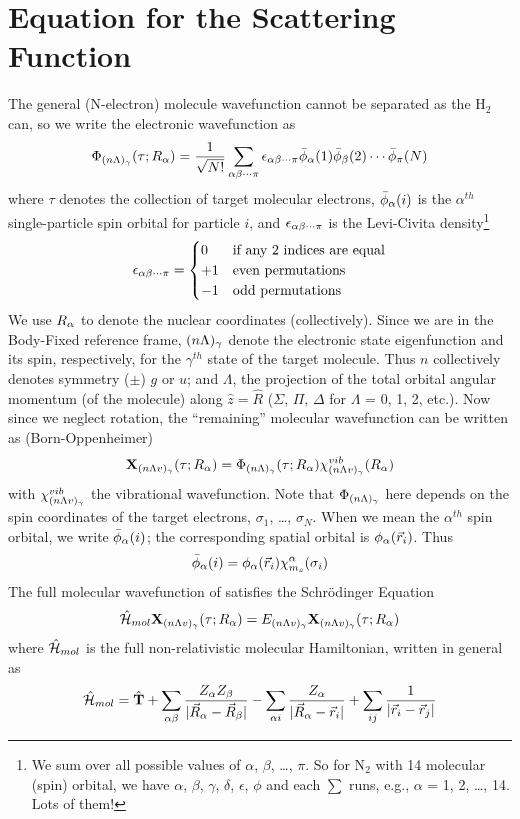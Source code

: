\documentclass[aps,pra,groupedaddress,12pt,
               amsfonts,amssymb,
               preprint
    ]{revtex4}
\begin{document}
\section{Equation for the Scattering Function}
The general (N-electron) molecule wavefunction cannot be separated as
the H$_2$ can, so we write the electronic wavefunction as
\begin{equation}
  \label{eq:ew}
  \Phi_{(n\Lambda)_\gamma}(\tau;R_\alpha)=\dfrac{1}{\sqrt{N!}}
  \sum_{\alpha\beta\cdots\pi}\epsilon_{\alpha\beta\cdots\pi}\bar{\phi}_\alpha(1)\bar{\phi}_\beta(2)\cdots\bar{\phi}_\pi(N)
\end{equation}
where $\tau$ denotes the collection of target molecular electrons,
$\bar{\phi}_\alpha(i)$ is the $\alpha^{th}$ single-particle spin orbital for
particle $i$, and $\epsilon_{\alpha\beta\cdots\pi}$ is the Levi-Civita density\footnote{We
  sum over all possible values of $\alpha$, $\beta$, \ldots, $\pi$. So
  for N$_2$ with 14 molecular (spin) orbital, we have $\alpha$, $\beta$,
  $\gamma$, $\delta$, $\epsilon$, $\phi$ and each $\sum$ runs, e.g.,
  $\alpha$ = 1, 2, \ldots, 14. Lots of them!}
\begin{equation*}
  \epsilon_{\alpha\beta\cdots\pi}=
  \begin{cases}
    0 &\text{if any 2 indices are equal} \\
    +1 &\text{even permutations} \\
    -1 &\text{odd permutations}
  \end{cases}
\end{equation*}
We use $R_\alpha$ to denote the nuclear coordinates (collectively). Since we
are in the Body-Fixed reference frame, $(n\Lambda)_\gamma$ denote the electronic
state eigenfunction and its spin, respectively, for the $\gamma^{th}$
state of the target molecule. Thus $n$ collectively denotes symmetry
($\pm$) $g$ or $u$; and $\Lambda$, the projection of the total orbital
angular momentum (of the molecule) along $\hat{z}=\hat{R}$ ($\Sigma$,
$\Pi$, $\Delta$ for $\Lambda$ = 0, 1, 2, etc.). Now since we neglect
rotation, the ``remaining'' molecular wavefunction can be written as
(Born-Oppenheimer) \label{com:norot}
\begin{equation}
  \label{eq:mw}
  \mathbf{X}_{(n\Lambda v)_\gamma}(\tau;R_\alpha)=\Phi_{(n\Lambda)_\gamma}(\tau;R_\alpha)\chi_{(n\Lambda v)_\gamma}^{vib}(R_\alpha)
\end{equation}
with $\chi_{(n\Lambda v)_\gamma}^{vib}$ the vibrational wavefunction. Note that
$\Phi_{(n\Lambda)_\gamma}$ here depends on the spin coordinates of the target
electrons, $\sigma_1$, \ldots, $\sigma_N$. When we mean the
$\alpha^{th}$ spin orbital, we write $\bar{\phi}_\alpha(i)$; the corresponding
spatial orbital is $\phi_\alpha(\vec{r}_{i})$. Thus
\begin{equation}
  \label{eq:sw}
  \bar{\phi}_\alpha(i) = \phi_\alpha(\vec{r}_{i})\chi_{m_s}^\alpha(\sigma_i)
\end{equation}
The full molecular wavefunction of  satisfies the
Schr\"{o}dinger Equation
\begin{equation}
  \label{eq:mse}
  \hat{\mathcal{H}}_{mol}\mathbf{X}_{(n\Lambda v)_\gamma}(\tau;R_\alpha) = E_{(n\Lambda v)_\gamma}\mathbf{X}_{(n\Lambda v)_\gamma}(\tau;R_\alpha)
\end{equation}
where $\hat{\mathcal{H}}_{mol}$ is the full non-relativistic molecular Hamiltonian,
written in general as
\begin{equation*}
  \hat{\mathcal{H}}_{mol} = \hat{\mathbf{T}} + \sum_{\alpha\beta}\frac{Z_\alpha Z_\beta}{|\vec{R}_\alpha-\vec{R}_\beta|}
              -\sum_{\alpha i}\frac{Z_\alpha}{|\vec{R}_\alpha-\vec{r}_{i}|}
              +\sum_{ij}\dfrac{1}{|\vec{r}_{i}-\vec{r}_{j}|}
\end{equation*}
\end{document}

